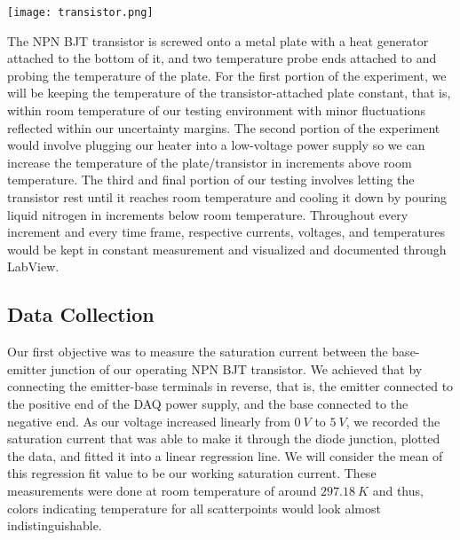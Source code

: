 \documentclass[10pt,letterpaper,onecolumn]{article}
\begin{document}
 \begin{center}
 \texttt{[image: transistor.png]}
 \label{fig:circuit}
 \end{center}

The NPN BJT transistor is screwed onto a metal plate with a heat generator attached to the bottom of it, and two temperature probe ends attached to and probing the temperature of the plate. For the first portion of the experiment, we will be keeping the temperature of the transistor-attached plate constant, that is, within room temperature of our testing environment with minor fluctuations reflected within our uncertainty margins. The second portion of the experiment would involve plugging our heater into a low-voltage power supply so we can increase the temperature of the plate/transistor in increments above room temperature. The third and final portion of our testing involves letting the transistor rest until it reaches room temperature and cooling it down by pouring liquid nitrogen in increments below room temperature. Throughout every increment and every time frame, respective currents, voltages, and temperatures would be kept in constant measurement and visualized and documented through LabView.






\subsection{Data Collection}

Our first objective was to measure the saturation current between the base-emitter junction of our operating NPN BJT transistor. We achieved that by connecting the emitter-base terminals in reverse, that is, the emitter connected to the positive end of the DAQ power supply, and the base connected to the negative end. As our voltage increased linearly from $0\ V$ to $5\ V$, we recorded the saturation current that was able to make it through the diode junction, plotted the data, and fitted it into a linear regression line. We will consider the mean of this regression fit value to be our working saturation current. These measurements were done at room temperature of around $297.18\ K$ and thus, colors indicating temperature for all scatterpoints would look almost indistinguishable.
\end{document}
